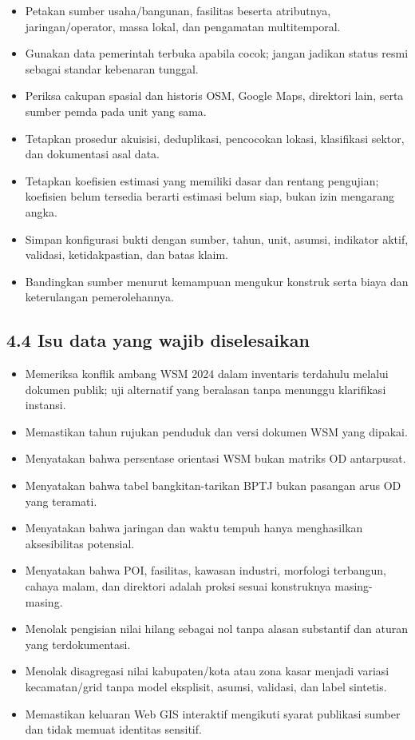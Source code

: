 \documentclass[
  indonesian,
  11pt,
]{article}
\providecommand{\tightlist}{%
  \setlength{\itemsep}{0pt}\setlength{\parskip}{0pt}}
\renewcommand{\tightlist}{%
  \setlength{\itemsep}{0.22em}%
  \setlength{\parskip}{0pt}%
}
\begin{document}
\begin{itemize}
\tightlist
\item[$\square$]
  Petakan sumber usaha/bangunan, fasilitas beserta atributnya,
  jaringan/operator, massa lokal, dan pengamatan multitemporal.
\item[$\square$]
  Gunakan data pemerintah terbuka apabila cocok; jangan jadikan status
  resmi sebagai standar kebenaran tunggal.
\item[$\square$]
  Periksa cakupan spasial dan historis OSM, Google Maps, direktori lain,
  serta sumber pemda pada unit yang sama.
\item[$\square$]
  Tetapkan prosedur akuisisi, deduplikasi, pencocokan lokasi,
  klasifikasi sektor, dan dokumentasi asal data.
\item[$\square$]
  Tetapkan koefisien estimasi yang memiliki dasar dan rentang pengujian;
  koefisien belum tersedia berarti estimasi belum siap, bukan izin
  mengarang angka.
\item[$\square$]
  Simpan konfigurasi bukti dengan sumber, tahun, unit, asumsi, indikator
  aktif, validasi, ketidakpastian, dan batas klaim.
\item[$\square$]
  Bandingkan sumber menurut kemampuan mengukur konstruk serta biaya dan
  keterulangan pemerolehannya.
\end{itemize}

\subsection{4.4 Isu data yang wajib
diselesaikan}\label{isu-data-yang-wajib-diselesaikan}

\begin{itemize}
\tightlist
\item[$\square$]
  Memeriksa konflik ambang WSM 2024 dalam inventaris terdahulu melalui
  dokumen publik; uji alternatif yang beralasan tanpa menunggu
  klarifikasi instansi.
\item[$\square$]
  Memastikan tahun rujukan penduduk dan versi dokumen WSM yang dipakai.
\item[$\square$]
  Menyatakan bahwa persentase orientasi WSM bukan matriks OD antarpusat.
\item[$\square$]
  Menyatakan bahwa tabel bangkitan-tarikan BPTJ bukan pasangan arus OD
  yang teramati.
\item[$\square$]
  Menyatakan bahwa jaringan dan waktu tempuh hanya menghasilkan
  aksesibilitas potensial.
\item[$\square$]
  Menyatakan bahwa POI, fasilitas, kawasan industri, morfologi
  terbangun, cahaya malam, dan direktori adalah proksi sesuai
  konstruknya masing-masing.
\item[$\square$]
  Menolak pengisian nilai hilang sebagai nol tanpa alasan substantif dan
  aturan yang terdokumentasi.
\item[$\square$]
  Menolak disagregasi nilai kabupaten/kota atau zona kasar menjadi
  variasi kecamatan/grid tanpa model eksplisit, asumsi, validasi, dan
  label sintetis.
\item[$\square$]
  Memastikan keluaran Web GIS interaktif mengikuti syarat publikasi
  sumber dan tidak memuat identitas sensitif.
\end{itemize}
\end{document}
